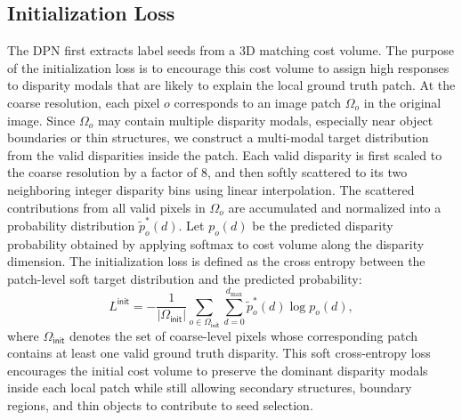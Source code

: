 \subsection{Initialization Loss}
The DPN first extracts label seeds from a 3D matching cost volume.
The purpose of the initialization loss is to encourage this cost volume to assign high responses to disparity modals that are likely to explain the local ground truth patch.
At the coarse resolution, each pixel $o$ corresponds to an image patch $\Omega_o$ in the original image.
Since $\Omega_o$ may contain multiple disparity modals, especially near object boundaries or thin structures, we construct a multi-modal target distribution from the valid disparities inside the patch.
Each valid disparity is first scaled to the coarse resolution by a factor of $8$, and then softly scattered to its two neighboring integer disparity bins using linear interpolation.
The scattered contributions from all valid pixels in $\Omega_o$  are accumulated and normalized into a probability distribution $\tilde{p}_o^*(d)$. 
Let $p_o(d)$ be the predicted disparity probability obtained by applying softmax to cost volume along the disparity dimension. 
The initialization loss is defined as the cross entropy between the patch-level soft target distribution and the predicted probability:
\begin{equation}
	L^{\textsf{init}}
	=
	-
	\frac{1}{|\Omega_{\textsf{init}}|}
	\sum_{o\in\Omega_{\textsf{init}}}
	\sum_{d=0}^{d_{\max}}
	\tilde{p}_o^*(d)
	\log p_o(d),
	\label{eq:init-loss}
\end{equation}
where $\Omega_{\textsf{init}}$ denotes the set of coarse-level pixels whose corresponding patch contains at least one valid ground truth disparity.
This soft cross-entropy loss encourages the initial cost volume to preserve the dominant disparity modals inside each local patch while still allowing secondary structures, boundary regions, and thin objects to contribute to seed selection.

